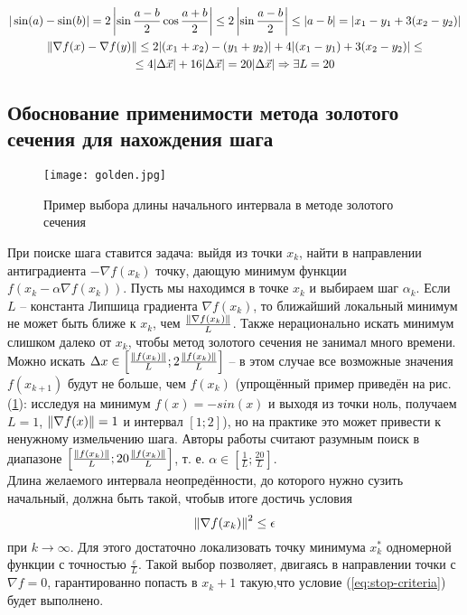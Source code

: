 \documentclass[main.tex]{subfiles}
\begin{document}
\begin{gather*}
|\sin(a) - \sin(b)| = 2 \left|\sin \frac{a-b}{2} \cos \frac{a+b}{2}\right| \le 2 \left|\sin\frac{a-b}{2}\right|\le |a-b|=|x_1-y_1 + 3(x_2-y_2)|\\
\left\lVert\nabla f(x)-\nabla f(y)\right\rVert \le 2 |(x_1+x_2)-(y_1+y_2)|+4|(x_1-y_1)+3(x_2-y_2)|\le \\
\le 4 |\Delta \vec{x}| + 16 |\Delta \vec{x}| = 20 |\Delta \vec{x}|  \Rightarrow \exists L = 20\\
\end{gather*}

\subsection{Обоснование применимости метода золотого сечения для нахождения шага}
\begin{figure}[h]
	\centering \texttt{[image: golden.jpg]}
	\caption{Пример выбора длины начального интервала в методе золотого сечения}
	\label{im:golden}
\end{figure}
При поиске шага ставится задача: выйдя из точки $x_k$, найти в направлении антиградиента $-\nabla f(x_k)$ точку, дающую минимум функции $f(x_k-\alpha \nabla f(x_k))$. 
Пусть мы находимся в точке $x_k$ и выбираем шаг $\alpha_k$. Если $L$ -- константа Липшица градиента $\nabla f(x_k)$, то ближайший локальный минимум не может быть ближе к $x_k$, чем $\frac{\left\lVert\nabla f(x_k)\right\rVert}{L}$. Также нерационально искать минимум слишком далеко от $x_k$, чтобы метод золотого сечения не занимал много времени. Можно искать $\Delta x \in \left[ \frac{\left\lVert f(x_k)\right\rVert}{L}; 2\frac{\left\lVert f(x_k)\right\rVert}{L}\right]$ -- в этом случае все возможные значения $f(x_{k+1})$ будут не больше, чем $f(x_k)$ (упрощённый пример приведён на рис. (\ref{im:golden}): исследуя на минимум $f(x)=-sin(x)$ и выходя из точки ноль, получаем $L=1$, $\left\lVert\nabla f(x)\right\rVert = 1$ и интервал $[1;2]$), но на практике это может привести к ненужному измельчению шага. Авторы работы считают разумным поиск в диапазоне $\left[ \frac{\left\lVert f(x_k)\right\rVert}{L}; 20\frac{\left\lVert f(x_k)\right\rVert}{L}\right]$, т. е. $\alpha \in \left[\frac{1}{L}; \frac{20}{L}\right]$. \\

Длина желаемого интервала неопредённости, до которого нужно сузить начальный, должна быть такой, чтобыв итоге достичь условия \\

\begin{equation}\label{eq:stop-criteria}
\left\lVert\nabla f(x_k)\right\rVert^2 \le \epsilon
\end{equation}
 при $k \rightarrow \infty$. Для этого достаточно локализовать точку минимума $x_k^*$ одномерной функции с точностью $\frac{\varepsilon}{L}$. Такой выбор позволяет, двигаясь в направлении точки с $\nabla f = 0$, гарантированно попасть в $x_k+1$ такую,что условие (\ref{eq:stop-criteria}) будет выполнено.
\end{document}
